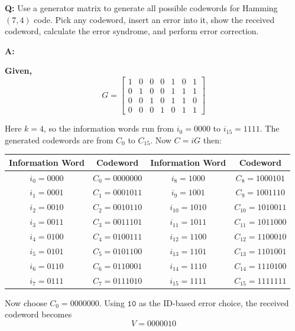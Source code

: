 \documentclass[11pt,a4paper]{book}
\renewcommand{\arraystretch}{1.4}
\newcounter{qna}[chapter]
\renewcommand{\theqna}{\thechapter.\arabic{qna}}
\newenvironment{questionanswerbox}[1][Example]{%
    \refstepcounter{qna}
    \begin{tcolorbox}[
        enhanced,
        breakable,
        colback=softlavender!10,
        colframe=softlavender!200,
        title={#1~\theqna},
        fonttitle=\bfseries,
        coltitle=white,
        colbacktitle=softlavender!200,
        sharp corners,
        boxrule=1pt,
        left=8pt,
        right=8pt,
        top=6pt,
        bottom=6pt
    ]
}{\end{tcolorbox}}
\begin{document}
\begin{questionanswerbox}[Hamming \((7,4)\) Generator Matrix Very Important Example]
\textbf{Q:} Use a generator matrix to generate all possible codewords for Hamming \((7,4)\) code. Pick any codeword, insert an error into it, show the received codeword, calculate the error syndrome, and perform error correction.

\textbf{A:}

\textbf{Given,}
\[
G=
\begin{bmatrix}
1&0&0&0&1&0&1\\
0&1&0&0&1&1&1\\
0&0&1&0&1&1&0\\
0&0&0&1&0&1&1
\end{bmatrix}
\]

Here \(k=4\), so the information words run from \(i_0=0000\) to \(i_{15}=1111\). The generated codewords are from \(C_0\) to \(C_15\). Now \(C = iG\) then:

\begin{center}
\renewcommand{\arraystretch}{1.15}
\setlength{\tabcolsep}{8pt}
\begin{tabular}{|c|c|c|c|}
\hline
\textbf{Information Word} & \textbf{Codeword} & \textbf{Information Word} & \textbf{Codeword} \\
\hline
\(i_0=0000\) & \(C_0=0000000\) & \(i_8=1000\) & \(C_8=1000101\) \\
\hline
\(i_1=0001\) & \(C_1=0001011\) & \(i_9=1001\) & \(C_9=1001110\) \\
\hline
\(i_2=0010\) & \(C_2=0010110\) & \(i_{10}=1010\) & \(C_{10}=1010011\) \\
\hline
\(i_3=0011\) & \(C_3=0011101\) & \(i_{11}=1011\) & \(C_{11}=1011000\) \\
\hline
\(i_4=0100\) & \(C_4=0100111\) & \(i_{12}=1100\) & \(C_{12}=1100010\) \\
\hline
\(i_5=0101\) & \(C_5=0101100\) & \(i_{13}=1101\) & \(C_{13}=1101001\) \\
\hline
\(i_6=0110\) & \(C_6=0110001\) & \(i_{14}=1110\) & \(C_{14}=1110100\) \\
\hline
\(i_7=0111\) & \(C_7=0111010\) & \(i_{15}=1111\) & \(C_{15}=1111111\) \\
\hline
\end{tabular}
\end{center}

Now choose \(C_0=0000000\). Using \(\texttt{10}\) as the ID-based error choice, the received codeword becomes
\[
V=0000010
\]


\end{questionanswerbox}
\end{document}
